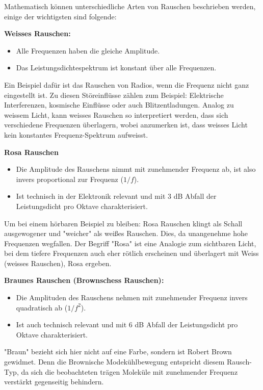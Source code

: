 Mathematisch können unterschiedliche Arten von Rauschen beschrieben werden, einige der wichtigsten sind folgende: 

\begin{definition}{\bf Weisses Rauschen:}
	\begin{itemize}
		\item Alle Frequenzen haben die gleiche Amplitude.
		\item Das Leistungsdichtespektrum ist konstant über alle Frequenzen. 
	\end{itemize}
Ein Beispiel dafür ist das Rauschen von Radios, wenn die Frequenz nicht ganz eingestellt ist. Zu diesen Störeinflüsse zählen zum Beispiel: Elektrische Interferenzen, kosmische Einflüsse oder auch Blitzentladungen. Analog zu weissem Licht, kann weisses Rauschen so interpretiert werden, dass sich verschiedene Frequenzen überlagern, wobei anzumerken ist, dass weisses Licht kein konstantes Frequenz-Spektrum aufweisst.
\end{definition}

\begin{definition}{\bf Rosa Rauschen}
	\begin{itemize}
		\item Die Amplitude des Rauschens nimmt mit zunehmender Frequenz ab, ist also invers proportional zur Frequenz ($ 1/f $).
		\item Ist technisch in der Elektronik relevant und mit 3 dB Abfall der Leistungsdicht pro Oktave charakterisiert.
	\end{itemize}
Um bei einem hörbaren Beispiel zu bleiben: Rosa Rauschen klingt als Schall ausgewogener und "weicher" als weißes Rauschen. Dies, da unangenehme hohe Frequenzen wegfallen. Der Begriff "Rosa" ist eine Analogie zum sichtbaren Licht, bei dem tiefere Frequenzen auch eher rötlich erscheinen und überlagert mit Weiss (weisses Rauschen), Rosa ergeben.
\end{definition}

\begin{definition}{\bf Braunes Rauschen (Brownschess Rauschen):}
	\begin{itemize}
		\item Die Amplituden des Rauschens nehmen mit zunehmender Frequenz invers quadratisch ab ($ 1/f^2 $).
		\item Ist auch technisch relevant und mit 6 dB Abfall der Leistungsdicht pro Oktave charakterisiert.
	\end{itemize}
"Braun" bezieht sich hier nicht auf eine Farbe, sondern ist Robert Brown gewidmet. Denn die Brownische Modekühlbewegung entspricht diesem Rausch-Typ, da sich die beobachteten trägen Moleküle mit zunehmender Frequenz verstärkt gegenseitig behindern.
\end{definition}

